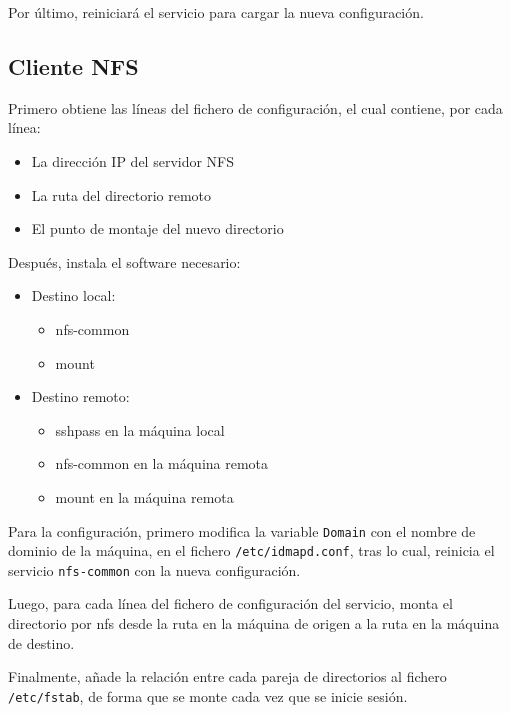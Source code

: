 Por último, reiniciará el servicio para cargar la nueva configuración.

\subsection{Cliente NFS}

Primero obtiene las líneas del fichero de configuración, el cual contiene, por cada línea:
\begin{itemize}
    \item La dirección IP del servidor NFS
    \item La ruta del directorio remoto
    \item El punto de montaje del nuevo directorio   
\end{itemize}

Después, instala el software necesario:
\begin{itemize}
    \item Destino local:
    \begin{itemize}
        \item nfs-common
        \item mount
    \end{itemize}
    \item Destino remoto:
    \begin{itemize}
        \item sshpass en la máquina local
        \item nfs-common en la máquina remota
        \item mount en la máquina remota
    \end{itemize}
\end{itemize}

Para la configuración, primero modifica la variable \texttt{Domain} con el nombre de dominio de la máquina, en el fichero \texttt{/etc/idmapd.conf}, tras lo cual, reinicia el servicio \texttt{nfs-common} con la nueva configuración.

Luego, para cada línea del fichero de configuración del servicio, monta el directorio por nfs desde la ruta en la máquina de origen a la ruta en la máquina de destino. 

Finalmente, añade la relación entre cada pareja de directorios al fichero \texttt{/etc/fstab}, de forma que se monte cada vez que se inicie sesión.